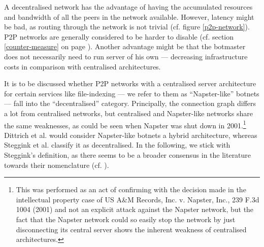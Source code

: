 \documentclass{llncs}
\begin{document}
A decentralised network has the advantage of having the accumulated
resources and bandwidth of all the peers in the network
available. However, latency might be bad, as routing through the
network is not trivial (cf. figure \ref{p2p-network}). P2P networks
are generally considered to be harder to disable (cf. section
\ref{counter-measure} on page \pageref{counter-measure}). Another
advantage might be that the botmaster does not necessarily need to run
server of his own --- decreasing infrastructure costs in comparison
with centralised architectures.

\label{napsterlike}
It is to be discussed whether P2P networks with a centralised server
architecture for certain services like file-indexing --- we refer to
them as ``Napster-like'' botnets --- fall into the ``decentralised''
category. Principally, the connection graph differs a lot from
centralised networks, but centralised and Napster-like networks share
the same weaknesses, as could be seen when Napster was shut down in
2001\cite{napsterWiki}.\footnote{This was performed as an act of
  confirming with the decision made in the intellectual property case
  of US A\&M Records, Inc. v. Napster, Inc., 239 F.3d 1004 (2001) and
  not an explicit attack against the Napster network, but the fact
  that the Napster network could so easily stop the network by just
  disconnecting its central server shows the inherent weakness of
  centralised architectures.}  Dittrich et
al. \cite{dittrich2007command} would consider Napster-like botnets a
hybrid architecture, whereas Steggink et al.
\cite{steggink2007detection} classify it as decentralised. In the
following, we stick with Steggink's definition, as there seems to be a
broader consensus in the literature towards their nomenclature
(cf. \cite{td1sc}).
\end{document}
